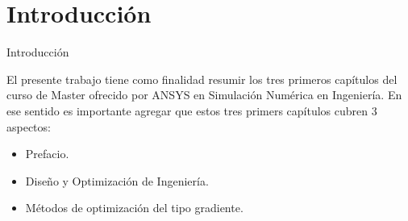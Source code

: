 \section{Introducción}
\begin{frame}{Introducción}

    \justify
    
    El presente trabajo tiene como finalidad resumir los tres primeros capítulos
    del curso de Master ofrecido por ANSYS en Simulación Numérica en Ingeniería.
    En ese sentido es importante agregar que estos tres primers capítulos cubren
    3 aspectos:
    \begin{itemize}
        \item Prefacio.
        \item Diseño y Optimización de Ingeniería.
        \item Métodos de optimización del tipo gradiente.
    \end{itemize}
    




\end{frame}

    

